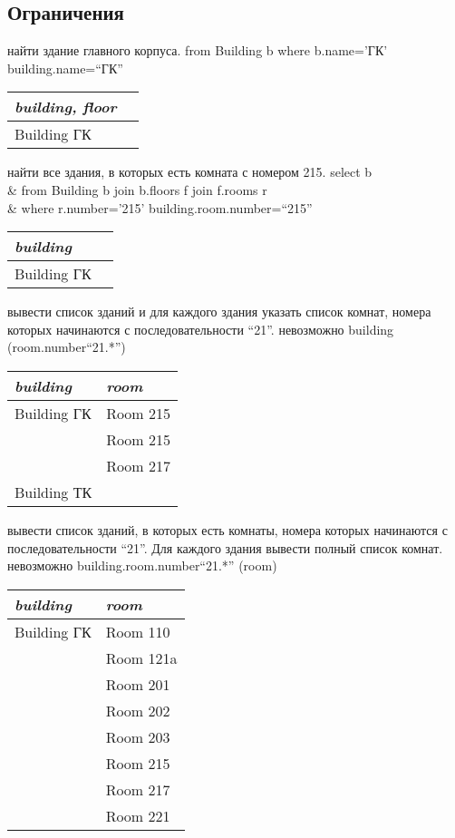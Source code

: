 \subsection{Ограничения}
\exastable
    {найти здание главного корпуса.}
    {from Building b where b.name='ГК'}
    {building.name=``ГК''}
    {\begin{tabular}{|l|l|}
	\hline
	\it{building, floor} \\[5pt]
	\hline
	\hline
	Building ГК\\
	\hline
	\end{tabular}}

\exastable
    {найти все здания, в которых есть комната с номером 215.}
    {select b \\ 
	& \hspace{0.4cm} from Building b join b.floors f join f.rooms r \\ 
	& \hspace{0.4cm} where r.number='215'}
    {building.room.number=``215''}
    {\begin{tabular}{|l|l|}
	\hline
	\it{building} \\[5pt]
	\hline
	\hline
	Building ГК\\
	\hline
    \end{tabular}}

\exastable
    {вывести список зданий и для каждого здания указать список комнат, 
	номера которых начинаются с последовательности ``21''.}
    {невозможно}
    {building (room.number``21.*'')}
    {\begin{tabular}{|l|l|}
	\hline
	\it{building} & \it{room} \\[5pt]
	\hline
	\hline
	Building ГК & Room 215\\
	\cline{2-2}
		    & Room 215\\
	\cline{2-2}
		    & Room 217\\
	\hline
	Building ТК & \cl{null}\\	
	\hline
    \end{tabular}}

\exastable
    {вывести список зданий, в которых есть комнаты, 
	номера которых начинаются с последовательности ``21''. 
	Для каждого здания вывести полный список комнат.}
    {невозможно}
    {building.room.number``21.*'' (room)}
    {\begin{tabular}{|l|l|}
	\hline
	\it{building} & \it{room} \\[5pt]
	\hline
	\hline
	Building ГК & Room 110\\
	\cline{2-2}
		    & Room 121a\\
	\cline{2-2}
		    & Room 201\\
	\cline{2-2}
		    & Room 202\\
	\cline{2-2}
		    & Room 203\\
	\cline{2-2}
		    & Room 215\\
	\cline{2-2}
		    & Room 217\\
	\cline{2-2}
		    & Room 221\\
	\hline
    \end{tabular}}

